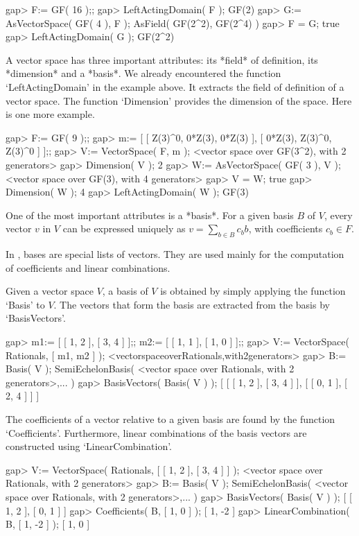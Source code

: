 \beginexample
gap> F:= GF( 16 );;
gap> LeftActingDomain( F );
GF(2)
gap> G:= AsVectorSpace( GF( 4 ), F );       
AsField( GF(2^2), GF(2^4) )
gap> F = G;
true
gap> LeftActingDomain( G );
GF(2^2)
\endexample

A vector space has three important attributes: its *field* of definition,
its *dimension* and a *basis*. We already encountered the function 
`LeftActingDomain' in the example above. It extracts the field of definition
of a vector space.
The function `Dimension' provides the dimension of the space.
Here is one more example.

\beginexample
gap> F:= GF( 9 );;
gap> m:= [ [ Z(3)^0, 0*Z(3), 0*Z(3) ], [ 0*Z(3), Z(3)^0, Z(3)^0 ] ];;
gap> V:= VectorSpace( F, m );
<vector space over GF(3^2), with 2 generators>
gap> Dimension( V );
2
gap> W:= AsVectorSpace( GF( 3 ), V );
<vector space over GF(3), with 4 generators>
gap> V = W;
true
gap> Dimension( W );
4
gap> LeftActingDomain( W );
GF(3)
\endexample

One of the most important attributes is a *basis*. For a given basis $B$ of 
$V$, every vector $v$ in $V$ can be expressed uniquely as 
$v = \sum_{b \in B} c_b b$, with coefficients $c_b \in F$.

In {\GAP}, bases are special lists of vectors.
They are used mainly for the computation of coefficients and linear
combinations. 

Given a vector space $V$, a basis of $V$ is obtained by
simply applying the function `Basis' to $V$. The vectors that form
the basis are extracted from the basis by `BasisVectors'. 

\beginexample
gap> m1:= [ [ 1, 2 ], [ 3, 4 ] ];; m2:= [ [ 1, 1 ], [ 1, 0 ] ];;
gap> V:= VectorSpace( Rationals, [ m1, m2 ] );
<vectorspaceoverRationals,with2generators>
gap> B:= Basis( V );
SemiEchelonBasis( <vector space over Rationals, with 2 generators>,... )
gap> BasisVectors( Basis( V ) );
[ [ [ 1, 2 ], [ 3, 4 ] ], [ [ 0, 1 ], [ 2, 4 ] ] ]
\endexample

The coefficients of 
a vector relative to a given basis are found by the function
`Coefficients'. Furthermore, linear combinations of the basis vectors
are constructed using `LinearCombination'.

\beginexample
gap> V:= VectorSpace( Rationals, [ [ 1, 2 ], [ 3, 4 ] ] );
<vector space over Rationals, with 2 generators>
gap> B:= Basis( V );
SemiEchelonBasis( <vector space over Rationals, with 2 generators>,... )
gap> BasisVectors( Basis( V ) );
[ [ 1, 2 ], [ 0, 1 ] ]
gap> Coefficients( B, [ 1, 0 ] );
[ 1, -2 ]
gap> LinearCombination( B, [ 1, -2 ] );
[ 1, 0 ]
\endexample

